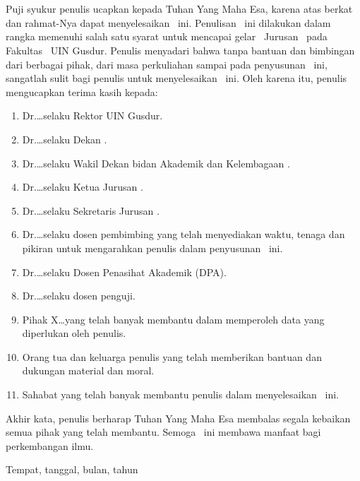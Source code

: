 %
%
%
\chapter*{\kataPengantar}

Puji syukur penulis ucapkan kepada Tuhan Yang Maha Esa, karena atas berkat
dan rahmat-Nya dapat menyelesaikan \type~ini.
Penulisan \type~ini dilakukan dalam rangka memenuhi salah satu syarat untuk
mencapai gelar \gelar~Jurusan \program~pada Fakultas \fakultas~UIN Gusdur.
Penulis menyadari bahwa tanpa bantuan dan bimbingan dari berbagai pihak,
dari masa perkuliahan sampai pada penyusunan \type~ini, sangatlah sulit bagi
penulis untuk menyelesaikan \type~ini.
Oleh karena itu, penulis mengucapkan terima kasih kepada:
\begin{enumerate}[topsep=0pt,itemsep=-1ex,partopsep=1ex,parsep=1ex]
	\item Dr.\ldots selaku Rektor UIN Gusdur.
	\item Dr.\ldots selaku Dekan \fakultas.
	\item Dr.\ldots selaku Wakil Dekan bidan Akademik dan Kelembagaan \fakultas.
	\item Dr.\ldots selaku Ketua Jurusan \program.
	\item Dr.\ldots selaku Sekretaris Jurusan \program.
	\item Dr.\ldots selaku dosen pembimbing yang telah menyediakan waktu, tenaga dan pikiran
	untuk mengarahkan penulis dalam penyusunan \type~ini.
	\item Dr.\ldots selaku Dosen Penasihat Akademik (DPA).
	\item Dr.\ldots selaku dosen penguji.
	\item Pihak X\ldots yang telah banyak membantu dalam memperoleh data yang
	diperlukan oleh penulis.
	\item Orang tua dan keluarga penulis yang telah memberikan bantuan dan
	dukungan material dan moral.
	\item Sahabat yang telah banyak membantu penulis dalam menyelesaikan \type~ini.
\end{enumerate}

Akhir kata, penulis berharap Tuhan Yang Maha Esa membalas segala kebaikan semua
pihak yang telah membantu. Semoga \type~ini membawa manfaat bagi perkembangan
ilmu.\\

\begin{ttdkanan}
 Tempat, tanggal, bulan, tahun\\[3em]

 \noindent\penulis
\end{ttdkanan}
